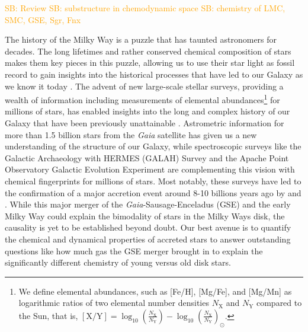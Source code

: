 \documentclass[fleqn,usenatbib]{mnras}
\newcommand{\SB}[1]{{\textcolor{orange}{SB: #1}}}
\newcommand{\Gaia}{\textit{Gaia}\xspace} %
\begin{document}
\SB{\citep{Deason2024} Review}
\SB{\citep{Carrillo2022} substructure in chemodynamic space}
\SB{\citep{Hasselquist2021} chemistry of LMC, SMC, GSE, Sgr, Fnx}


The history of the Milky Way is a puzzle that has taunted astronomers for decades. The long lifetimes and rather conserved chemical composition of stars makes them key pieces in this puzzle, allowing us to use their star light as fossil record to gain insights into the historical processes that have led to our Galaxy as we know it today \citep{FreemanBlandHawthorn2002}. The advent of new large-scale stellar surveys, providing a wealth of information including measurements of elemental abundances\footnote{We define elemental abundances, such as [Fe/H], [Mg/Fe], and [Mg/Mn] as logarithmic ratios of two elemental number densities $N_\text{X}$ and $N_\text{Y}$ compared to the Sun, that is, $\left[\text{X/Y}\right]=\log_{10}\left(\frac{N_\text{X}}{N_\text{Y}}\right) -\log_{10}\left(\frac{N_\text{X}}{N_\text{Y}}\right)_\odot$.} for millions of stars, has enabled insights into the long and complex history of our Galaxy that have been previously unattainable \citep{Jofre2019}. Astrometric information for more than 1.5 billion stars from the \Gaia satellite \citep{Brown2016,Brown2018,Brown2021} has given us a new understanding of the structure of our Galaxy, while spectroscopic surveys like the Galactic Archaeology with HERMES (GALAH) Survey \citep{daSilva2015} and the Apache Point Observatory Galactic Evolution Experiment \citep[APOGEE,][]{Majewski2016} are complementing this vision with chemical fingerprints for millions of stars. Most notably, these surveys have led to the confirmation of a major accretion event around 8-10 billions years ago by \citet{Belokurov2018} and \citet{Helmi2018}. While this major merger of the \Gaia-Sausage-Enceladus (GSE) and the early Milky Way could explain the bimodality of stars in the Milky Ways disk, the causality is yet to be established beyond doubt. Our best avenue is to quantify the chemical and dynamical properties of accreted stars to answer outstanding questions like how much gas the GSE merger brought in to explain the significantly different chemistry of young versus old disk stars.
\end{document}
